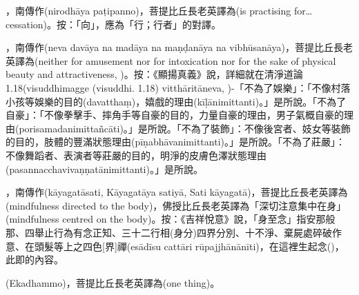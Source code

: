 \startitemgroup[noteitems]
\item{}，南傳作(nirodhāya paṭipanno)，菩提比丘長老英譯為(is practising for…cessation)。按：「向」，應為「行；行者」的對譯。
\stopitemgroup

\startitemgroup[noteitems]
\item{}，南傳作(neva davāya na madāya na maṇḍanāya na vibhūsanāya)，菩提比丘長老英譯為(neither for amusement nor for intoxication nor for the sake of physical beauty and attractiveness, )。按：《顯揚真義》說，詳細就在清淨道論1.18(visuddhimagge (visuddhi. 1.18) vitthāritāneva, )-「不為了娛樂」：「不像村落小孩等娛樂的目的(davatthaṃ)，嬉戲的理由(kīḷānimittanti)。」是所說。「不為了自豪」：「不像拳擊手、摔角手等自豪的目的，力量自豪的理由，男子氣概自豪的理由(porisamadanimittañcāti)。」是所說。「不為了裝飾」：不像後宮者、妓女等裝飾的目的，肢體的豐滿狀態理由(pīṇabhāvanimittanti)。」是所說。「不為了莊嚴」：不像舞蹈者、表演者等莊嚴的目的，明淨的皮膚色澤狀態理由(pasannacchavivaṇṇatānimittanti)。」是所說。
\stopitemgroup

\startitemgroup[noteitems]
\item{}，南傳作(kāyagatāsati, Kāyagatāya satiyā, Sati kāyagatā)，菩提比丘長老英譯為(mindfulness directed to the body)，佛授比丘長老英譯為「深切注意集中在身」(mindfulness centred on the body)。按：《吉祥悅意》說，「身至念」指安那般那、四舉止行為有念正知、三十二行相(身分)四界分別、十不淨、棄屍處碎破作意、在頭髮等上之四色[界]禪(esādīsu cattāri rūpajjhānānīti)，在這裡生起念()，此即的內容。
\stopitemgroup

\startitemgroup[noteitems]
\item{}(Ekadhammo)，菩提比丘長老英譯為(one thing)。
\stopitemgroup


